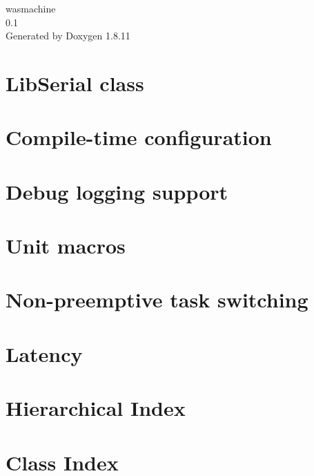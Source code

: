 \documentclass[twoside]{book}
\newcommand{\+}{\discretionary{\mbox{\scriptsize$\hookleftarrow$}}{}{}}
\newcommand{\clearemptydoublepage}{%
  \newpage{\pagestyle{empty}\cleardoublepage}%
}
\begin{document}
\hypersetup{pageanchor=false,
             bookmarksnumbered=true,
             pdfencoding=unicode
            }
\begin{titlepage}
\vspace*{7cm}
\begin{center}%
{\Large wasmachine \\[1ex]\large 0.\+1 }\\
\vspace*{1cm}
{\large Generated by Doxygen 1.8.11}\\
\end{center}
\end{titlepage}
\clearemptydoublepage
\tableofcontents
\clearemptydoublepage
{}
\hypersetup{pageanchor=true}

\chapter{Lib\+Serial class}
\label{index}\hypertarget{index}{}
\chapter{Compile-\/time configuration}
\label{configuration}
\hypertarget{configuration}{}

\chapter{Debug logging support}
\label{debug}
\hypertarget{debug}{}

\chapter{Unit macro\textquotesingle{}s}
\label{units}
\hypertarget{units}{}

\chapter{Non-\/preemptive task switching}
\label{non-preemptive}
\hypertarget{non-preemptive}{}

\chapter{Latency}
\label{latency}
\hypertarget{latency}{}

\chapter{Hierarchical Index}

\chapter{Class Index}

\end{document}
